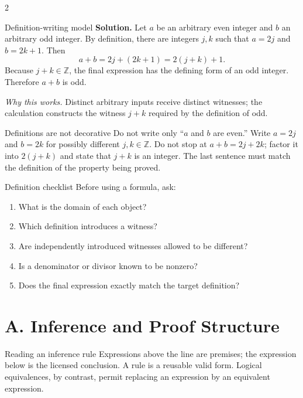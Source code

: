 \documentclass[10pt]{article}
\newcommand{\why}{\textit{Why this works.} }
\newcommand{\Z}{\mathbb Z}
\begin{document}
\begin{multicols}{2}
\begin{workedbox}{Definition-writing model}
\textbf{Solution.} Let $a$ be an arbitrary even integer and $b$ an arbitrary
odd integer. By definition, there are integers $j,k$ such that
$a=2j$ and $b=2k+1$. Then
\[
 a+b=2j+(2k+1)=2(j+k)+1.
\]
Because $j+k\in\Z$, the final expression has the defining form of an odd
integer. Therefore $a+b$ is odd.

\why Distinct arbitrary inputs receive distinct witnesses; the calculation
constructs the witness $j+k$ required by the definition of odd.
\end{workedbox}

\begin{warningbox}{Definitions are not decorative}
Do not write only ``$a$ and $b$ are even.'' Write $a=2j$ and $b=2k$ for
possibly different $j,k\in\Z$. Do not stop at $a+b=2j+2k$; factor it into
$2(j+k)$ and state that $j+k$ is an integer. The last sentence must match the
definition of the property being proved.
\end{warningbox}

\begin{checklistbox}{Definition checklist}
Before using a formula, ask:
\begin{enumerate}
  \item What is the domain of each object?
  \item Which definition introduces a witness?
  \item Are independently introduced witnesses allowed to be different?
  \item Is a denominator or divisor known to be nonzero?
  \item Does the final expression exactly match the target definition?
\end{enumerate}
\end{checklistbox}
\end{multicols}

\clearpage
\section*{A. Inference and Proof Structure}

\begin{definitionbox}{Reading an inference rule}
Expressions above the line are premises; the expression below is the licensed
conclusion. A rule is a reusable valid form. Logical equivalences, by contrast,
permit replacing an expression by an equivalent expression.
\end{definitionbox}
\end{document}
